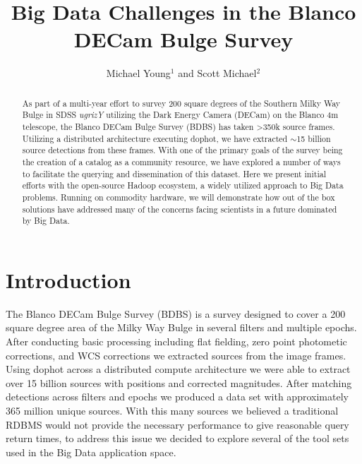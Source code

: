 \documentclass[11pt,twoside]{article}
\begin{document}

\title{Big Data Challenges in the Blanco DECam Bulge Survey}
\author{Michael Young$^1$ and Scott Michael$^2$
}


\begin{abstract}
  As part of a multi-year effort to survey 200 square degrees of the Southern Milky Way Bulge in SDSS
  \textit{ugrizY} utilizing the Dark Energy Camera (DECam) on the Blanco 4m telescope, the Blanco DECam Bulge
  Survey (BDBS) has taken >350k source frames. Utilizing a distributed architecture executing dophot, we have
  extracted $\sim$15 billion source detections from these frames. With one of the primary goals of the survey
  being the creation of a catalog as a community resource, we have explored a number of ways to facilitate the
  querying and dissemination of this dataset. Here we present initial efforts with the open-source Hadoop
  ecosystem, a widely utilized approach to Big Data problems. Running on commodity hardware, we will
  demonstrate how out of the box solutions have addressed many of the concerns facing scientists in a future
  dominated by Big Data.
\end{abstract}

\section{Introduction}
The Blanco DECam Bulge Survey (BDBS) is a survey designed to cover a 200 square degree area of the Milky Way
Bulge in several filters and multiple epochs. After conducting basic processing including flat fielding, zero
point photometic corrections, and WCS corrections we extracted sources from the image frames. Using dophot
across a distributed compute architecture we were able to extract over 15 billion sources with positions and
corrected magnitudes. After matching detections across filters and epochs we produced a data set with
approximately 365 million unique sources. With this many sources we believed a traditional RDBMS would not
provide the necessary performance to give reasonable query return times, to address this issue we decided to
explore several of the tool sets used in the Big Data application space.
\end{document}
